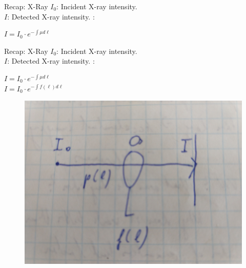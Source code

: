 \begin{frame}{Recap: X-Ray}
    $I_0$: Incident X-ray intensity. \\
    $I$: Detected X-ray intensity.
    \vskip12pt
    :\\
    \begin{center}
     \vskip6pt
        $I=I_0\cdot e^{-\int \mu d\ell}$\\

   \end{center}

 \end{frame}
    
 \begin{frame}{Recap: X-Ray}
    $I_0$: Incident X-ray intensity. \\
    $I$: Detected X-ray intensity.
    \vskip12pt
    :\\
    \begin{center}
     \vskip6pt
        $I=I_0\cdot e^{-\int \mu d\ell}$\\
        \vskip6pt
        $I=I_0\cdot e^{-\int f(\ell) d\ell}$\\
    \end{center}

	\begin{figure}[tbp]
		\centering
		\includegraphics[height=0.3\textheight]{images/x_ray_sketch}
		\label{fig:x_ray_sketch}
	\end{figure}
 \end{frame}

